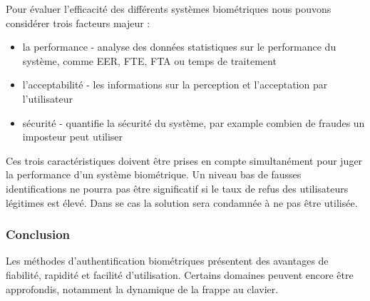 Pour évaluer l'efficacité des différents systèmes biométriques nous pouvons considérer trois facteurs majeur :\\

\begin{itemize}
\item la performance - analyse des données statistiques sur le performance du système, comme EER, FTE, FTA ou temps de traitement
\item l'acceptabilité - les informations sur la perception et l'acceptation par l'utilisateur 
\item sécurité - quantifie la sécurité du système, par example combien de fraudes un imposteur peut utiliser\\
\end{itemize}

Ces trois caractéristiques doivent être prises en compte simultanément pour juger la performance d'un système biométrique. Un niveau bas de fausses identifications ne pourra pas être significatif si le taux de refus des utilisateurs légitimes est élevé. Dans se cas la solution sera condamnée à ne pas être utilisée.

\subsubsection{Conclusion}

Les méthodes d'authentification biométriques présentent des avantages de fiabilité, rapidité et facilité d'utilisation. Certains domaines peuvent encore être approfondis, notamment la dynamique de la frappe au clavier.
